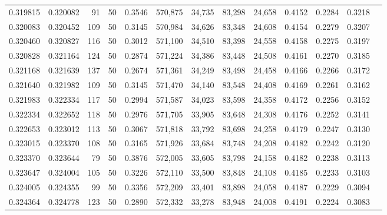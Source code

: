 \begin{tabular}{rrrrrrrrrrrrr}
0.319815 & 0.320082 &    91 &  50 &                                     0.3546 & 570,875 &  34,735 &  83,298 &  24,658 & 0.4152 & 0.2284 & 0.3218 \\
0.320083 & 0.320452 &   109 &  50 &                                     0.3145 & 570,984 &  34,626 &  83,348 &  24,608 & 0.4154 & 0.2279 & 0.3207 \\
0.320460 & 0.320827 &   116 &  50 &                                     0.3012 & 571,100 &  34,510 &  83,398 &  24,558 & 0.4158 & 0.2275 & 0.3197 \\
0.320828 & 0.321164 &   124 &  50 &                                     0.2874 & 571,224 &  34,386 &  83,448 &  24,508 & 0.4161 & 0.2270 & 0.3185 \\
0.321168 & 0.321639 &   137 &  50 &                                     0.2674 & 571,361 &  34,249 &  83,498 &  24,458 & 0.4166 & 0.2266 & 0.3172 \\
0.321640 & 0.321982 &   109 &  50 &                                     0.3145 & 571,470 &  34,140 &  83,548 &  24,408 & 0.4169 & 0.2261 & 0.3162 \\
0.321983 & 0.322334 &   117 &  50 &                                     0.2994 & 571,587 &  34,023 &  83,598 &  24,358 & 0.4172 & 0.2256 & 0.3152 \\
0.322334 & 0.322652 &   118 &  50 &                                     0.2976 & 571,705 &  33,905 &  83,648 &  24,308 & 0.4176 & 0.2252 & 0.3141 \\
0.322653 & 0.323012 &   113 &  50 &                                     0.3067 & 571,818 &  33,792 &  83,698 &  24,258 & 0.4179 & 0.2247 & 0.3130 \\
0.323015 & 0.323370 &   108 &  50 &                                     0.3165 & 571,926 &  33,684 &  83,748 &  24,208 & 0.4182 & 0.2242 & 0.3120 \\
0.323370 & 0.323644 &    79 &  50 &                                     0.3876 & 572,005 &  33,605 &  83,798 &  24,158 & 0.4182 & 0.2238 & 0.3113 \\
0.323647 & 0.324004 &   105 &  50 &                                     0.3226 & 572,110 &  33,500 &  83,848 &  24,108 & 0.4185 & 0.2233 & 0.3103 \\
0.324005 & 0.324355 &    99 &  50 &                                     0.3356 & 572,209 &  33,401 &  83,898 &  24,058 & 0.4187 & 0.2229 & 0.3094 \\
0.324364 & 0.324778 &   123 &  50 &                                     0.2890 & 572,332 &  33,278 &  83,948 &  24,008 & 0.4191 & 0.2224 & 0.3083 \\

\end{tabular}
